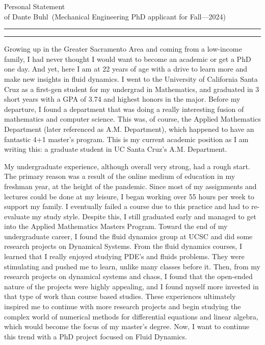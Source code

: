\documentclass{article}
\newcommand{\soptitle}{Personal Statement}
\newcommand{\yourname}{Dante Buhl}
\begin{document}
\begin{center}\LARGE\soptitle\\
\large of \yourname\ (Mechanical Engineering PhD applicant for Fall---2024)
\end{center}

\hrule
\vspace{1pt}
\hrule height 1pt

\bigskip

\large
Growing up in the Greater Sacramento Area and coming from a low-income family, I had never thought I would want to become an academic or get a PhD one day. And yet, here I am at 22 years of age with a drive to learn more and make new insights in fluid dynamics. I went to the University of California Santa Cruz as a first-gen student for my undergrad in Mathematics,  and graduated in 3 short years with a GPA of 3.74 and highest honors in the major. Before my departure, I found a department that was doing a really interesting fusion of mathematics and computer science. This was, of course, the Applied Mathematics Department (later referenced as A.M. Department), which happened to have an fantastic 4+1 master's program. This is my current academic position as I am writing this: a graduate student in UC Santa Cruz's A.M. Department. 

My undergraduate experience, although overall very strong, had a rough start. The primary reason was a result of the online medium of education in my freshman year, at the height of the pandemic. Since most of my assignments and lectures could be done at my leisure, I began working over 55 hours per week to support my family. I eventually failed a course due to this practice and had to re-evaluate my study style. Despite this, I still graduated early and managed to get into the Applied Mathematics Masters Program. Toward the end of my undergraduate career, I found the fluid dynamics group at UCSC and did some research projects on Dynamical Systems. From the fluid dynamics courses, I learned that I really enjoyed studying PDE's and fluids problems. They were stimulating and pushed me to learn, unlike many classes before it. Then, from my research projects on dynamical systems and chaos, I found that the open-ended nature of the projects were highly appealing, and I found myself more invested in that type of work than course based studies. These experiences ultimately inspired me to continue with more research projects and begin studying the complex world of numerical methods for differential equations and linear algebra, which would become the focus of my master's degree. Now, I want to continue this trend with a PhD project focused on Fluid Dynamics.
\end{document}
